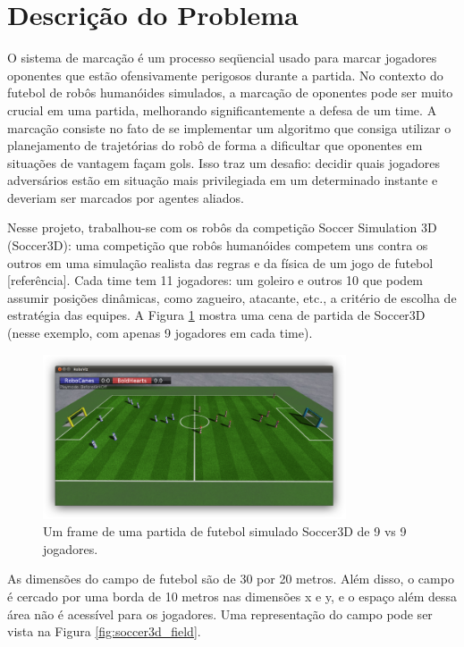 \documentclass[a4paper,12pt]{article}
\begin{document}
\section{Descrição do Problema}
\label{secao:enunciado_problema}

O sistema de marcação é um processo seqüencial usado para marcar jogadores oponentes que estão ofensivamente perigosos durante a partida. No contexto do futebol de robôs humanóides simulados, a marcação de oponentes pode ser muito crucial em uma partida, melhorando significantemente a defesa de um time. A marcação consiste no fato de se implementar um algoritmo que consiga utilizar o planejamento de trajetórias do robô de forma a dificultar que oponentes em situações de vantagem façam gols. Isso traz um desafio: decidir quais jogadores adversários estão em situação mais privilegiada em um determinado instante e deveriam ser marcados por agentes aliados. 

Nesse projeto, trabalhou-se com os robôs da competição Soccer Simulation 3D (Soccer3D): uma competição que robôs humanóides competem uns contra os outros em uma simulação realista das regras e da física de um jogo de futebol [referência]. Cada time tem 11 jogadores: um goleiro e outros 10 que podem assumir posições dinâmicas, como zagueiro, atacante, etc., a critério de escolha de estratégia das equipes. A Figura \ref{fig:soccer3d-play} mostra uma cena de partida de Soccer3D (nesse exemplo, com apenas 9 jogadores em cada time).

\begin{figure}[H]
	\centering
	\includegraphics[width=0.8\textwidth]{figures/soccer3d-play.png}
   \caption{Um frame de uma partida de futebol simulado Soccer3D de 9 vs 9 jogadores.} \label{fig:soccer3d-play}
\end{figure}

As dimensões do campo de futebol são de 30 por 20 metros. Além disso, o campo é cercado por uma borda de 10 metros nas dimensões x e y, e o espaço além dessa área não é acessível para os jogadores. Uma representação do campo pode ser vista na Figura \ref{fig:soccer3d_field}.
\end{document}
